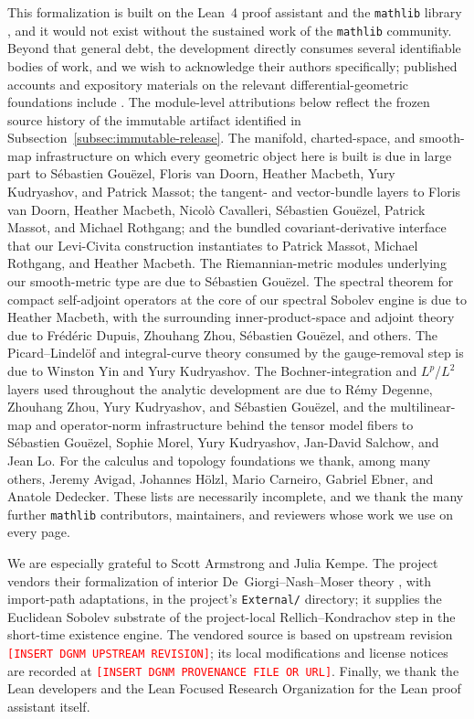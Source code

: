 \documentclass[11pt]{article}
\theoremstyle{plain}
\theoremstyle{definition}
\theoremstyle{remark}
\begin{document}
This formalization is built on the Lean~4 proof assistant and the
\texttt{mathlib} library \cite{deMouraUllrichLean4,mathlib}, and it would not exist
without the sustained work of the \texttt{mathlib} community.  Beyond that
general debt, the development directly consumes several identifiable bodies of
work, and we wish to acknowledge their authors specifically; published
accounts and expository materials on the relevant differential-geometric
foundations include
\cite{GouezelHigherOrderCalculus,BordgCavalleriDGLean,RothgangDGMathlib,
MassotVanDoornNashSphereEversion}.  The module-level attributions below reflect
the frozen source history of the immutable artifact identified in
Subsection~\ref{subsec:immutable-release}.  The manifold,
charted-space, and smooth-map infrastructure on which every geometric object
here is built is due in large part to S\'ebastien Gou\"ezel, Floris van Doorn,
Heather Macbeth, Yury Kudryashov, and Patrick Massot; the tangent- and
vector-bundle layers to Floris van Doorn, Heather Macbeth, Nicol\`o Cavalleri,
S\'ebastien Gou\"ezel, Patrick Massot, and Michael Rothgang; and the bundled
covariant-derivative interface that our Levi-Civita construction instantiates
to Patrick Massot, Michael Rothgang, and Heather Macbeth.  The
Riemannian-metric modules underlying our smooth-metric type are due to
S\'ebastien Gou\"ezel.  The spectral theorem for compact self-adjoint
operators at the core of our spectral Sobolev engine is due to Heather
Macbeth, with the surrounding inner-product-space and adjoint theory due to
Fr\'ed\'eric Dupuis, Zhouhang Zhou, S\'ebastien Gou\"ezel, and others.  The
Picard--Lindel\"of and integral-curve theory consumed by the gauge-removal
step is due to Winston Yin and Yury Kudryashov.  The Bochner-integration and
$L^p$/$L^2$ layers used throughout the analytic development are due to R\'emy
Degenne, Zhouhang Zhou, Yury Kudryashov, and S\'ebastien Gou\"ezel, and the
multilinear-map and operator-norm infrastructure behind the tensor model
fibers to S\'ebastien Gou\"ezel, Sophie Morel, Yury Kudryashov, Jan-David
Salchow, and Jean Lo.  For the calculus and topology foundations we thank,
among many others, Jeremy Avigad, Johannes H\"olzl, Mario Carneiro, Gabriel
Ebner, and Anatole Dedecker.  These lists are necessarily incomplete, and we
thank the many further \texttt{mathlib} contributors, maintainers, and
reviewers whose work we use on every page.

We are especially grateful to Scott Armstrong and Julia Kempe.  The project
vendors their formalization of interior
De~Giorgi--Nash--Moser theory \cite{ArmstrongKempeDGNM}, with import-path
adaptations, in the project's \texttt{External/} directory; it supplies the
Euclidean Sobolev substrate of the project-local Rellich--Kondrachov step in the
short-time existence engine.  The vendored source is based on upstream revision
\textcolor{red}{\texttt{[INSERT DGNM UPSTREAM REVISION]}}; its local
modifications and license notices are recorded at
\textcolor{red}{\texttt{[INSERT DGNM PROVENANCE FILE OR URL]}}.
Finally, we thank the Lean developers and the Lean Focused Research
Organization for the Lean proof assistant itself.
\clearpage
\appendix
\end{document}
